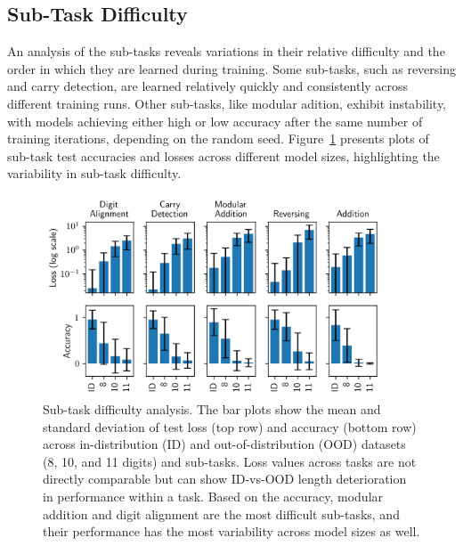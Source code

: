 \subsection{Sub-Task Difficulty}

An analysis of the sub-tasks reveals variations in their relative difficulty and the order in which they are learned during training. Some sub-tasks, such as reversing and carry detection, are learned relatively quickly and consistently across different training runs. Other sub-tasks, like modular adition, exhibit instability, with models achieving either high or low accuracy after the same number of training iterations, depending on the random seed. Figure~\ref{fig:subtask_difficulty} presents plots of sub-task test accuracies and losses across different model sizes, highlighting the variability in sub-task difficulty.

\begin{figure}[htb!]
  \centering
  \includegraphics[width=0.9\textwidth]{fig/subtask_difficulty.png}
  \caption{Sub-task difficulty analysis. The bar plots show the mean and standard deviation of test loss (top row) and accuracy (bottom row) across in-distribution (ID) and out-of-distribution (OOD) datasets (8, 10, and 11 digits) and sub-tasks. Loss values across tasks are not directly comparable but can show ID-vs-OOD length deterioration in performance within a task. Based on the accuracy, modular addition and digit alignment are the most difficult sub-tasks, and their performance has the most variability across model sizes as well.}
  \label{fig:subtask_difficulty}
\end{figure}
